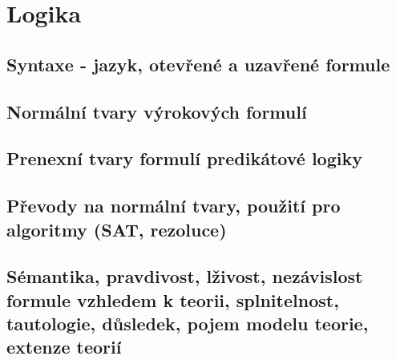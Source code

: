 \documentclass[../../main.tex]{subfiles}
\begin{document}
\section{Logika}

\subsection{Syntaxe - jazyk, otevřené a uzavřené formule}
\subsection{Normální tvary výrokových formulí}
\subsection{Prenexní tvary formulí predikátové logiky}
\subsection{Převody na normální tvary, použití pro algoritmy (SAT, rezoluce)}
\subsection{Sémantika, pravdivost, lživost, nezávislost formule vzhledem k teorii, splnitelnost, tautologie, důsledek, pojem modelu teorie, extenze teorií}
\end{document}
